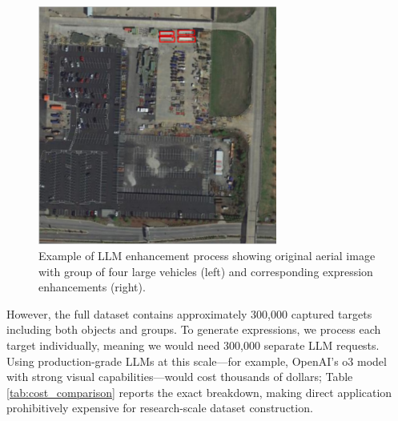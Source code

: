 \begin{figure}[t]
\centering
\begin{minipage}{0.5\textwidth}
\centering
\includegraphics[width=0.7\textwidth]{Images/example_group.png}
\end{minipage}%
\begin{minipage}{0.5\textwidth}
\centering
\hspace{-1cm}
\end{minipage}
\caption{Example of LLM enhancement process showing original aerial image with group of four large vehicles (left) and corresponding expression enhancements (right).}
\label{fig:llm_enhancement_example}
\end{figure}

However, the full dataset contains approximately 300,000 captured targets including both objects and groups. To generate expressions, we process each target individually, meaning we would need 300,000 separate LLM requests. Using production-grade LLMs at this scale—for example, OpenAI's o3 model\cite{o3} with strong visual capabilities—would cost thousands of dollars; Table \ref{tab:cost_comparison} reports the exact breakdown, making direct application prohibitively expensive for research-scale dataset construction.

